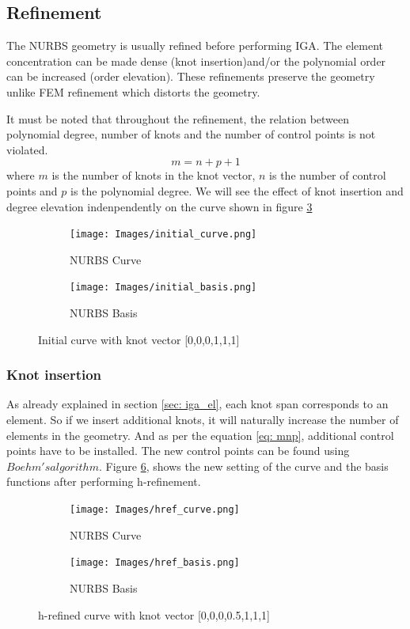 \documentclass[12pt, a4paper]{report}
\begin{document}
\subsection{Refinement} \label{sec: iga_refinement}
The NURBS geometry is usually refined before performing IGA. The element concentration can be made dense (knot insertion)and/or the polynomial order can be increased (order elevation). These refinements preserve the geometry unlike FEM refinement which distorts the geometry.
\par It must be noted that throughout the refinement, the relation between polynomial degree, number of knots and the number of control points is not violated.
\begin{equation} \label{eq: mnp}
    m=n+p+1
\end{equation}
where $m$ is the number of knots in the knot vector, $n$ is the number of control points and $p$ is the polynomial degree.
We will see the effect of knot insertion and degree elevation indenpendently on the curve shown in figure \ref{fig:initial_refinement}
\begin{figure}[H]
\centering
\begin{subfigure}{.5\textwidth}
  \centering
  \texttt{[image: Images/initial\_curve.png]}
  \caption{NURBS Curve}
  \label{fig:in_curve}
\end{subfigure}%
\begin{subfigure}{.6\textwidth}
  \centering
  \texttt{[image: Images/initial\_basis.png]}
  \caption{NURBS Basis}
  \label{fig:in_basis}
\end{subfigure}
\caption{Initial curve with knot vector [0,0,0,1,1,1]}
\label{fig:initial_refinement}
\end{figure}

\subsubsection{Knot insertion \cite{nurbs_refinement}} 
As already explained in section \ref{sec: iga_el}, each knot span corresponds to an element. So if we insert additional knots, it will naturally increase the number of elements in the geometry. And as per the equation \ref{eq: mnp}, additional control points have to be installed. The new control points can be found using $Boehm's algorithm$\cite{boehm}. Figure \ref{fig:href}, shows the new setting of the curve and the basis functions after performing h-refinement.
\begin{figure}[H]
\centering
\begin{subfigure}{.5\textwidth}
  \centering
  \texttt{[image: Images/href\_curve.png]}
  \caption{NURBS Curve}
  \label{fig:href_curve}
\end{subfigure}%
\begin{subfigure}{.6\textwidth}
  \centering
  \texttt{[image: Images/href\_basis.png]}
  \caption{NURBS Basis}
  \label{fig:href_basis}
\end{subfigure}
\caption{h-refined curve with knot vector [0,0,0,0.5,1,1,1]}
\label{fig:href}
\end{figure}
\end{document}
